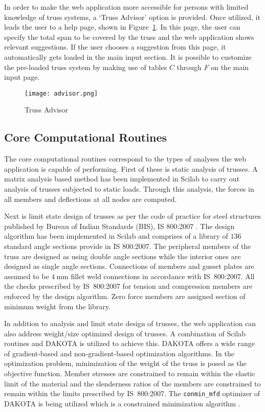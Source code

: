\documentclass[preprint]{elsarticle}
\begin{document}
In order to make the web application more accessible for persons with limited
knowledge of truss systems, a `Truss Advisor' option is provided. Once utilized,
it leads the user to a help page, shown in Figure~\ref{fig:advisor}. In this page,
the user can specify the total span to be covered by the truss and the web
application shows relevant suggestions. If the user chooses a suggestion from
this page, it automatically gets loaded in the main input section. It is
possible to customize the pre-loaded truss system by making use of tables $C$
through $F$ on the main input page.


\begin{figure}
\centering
\texttt{[image: advisor.png]}
\caption{Truss Advisor}
\label{fig:advisor}
\end{figure}


\subsection{Core Computational Routines}
The core computational routines correspond to the types of analyses the web
application is capable of performing. First of these is static analysis of
trusses. A matrix analysis based method has been implemented in Scilab to carry
out analysis of trusses subjected to static loads. Through this analysis, the
forces in all members and deflections at all nodes are computed.

Next is limit state design of trusses as per the code of practice for steel
structures published by Bureau of Indian Standards (BIS), IS 800:2007
\cite{IS800}. The design algorithm has been implemented in Scilab and comprises
of a library of $136$ standard angle sections provide in IS 800:2007. The
peripheral members of the truss are designed as using double angle sections while
the interior ones are designed as single angle sections. Connections of members
and gusset plates are assumed to be $4~\mathrm{mm}$ fillet weld connections
in accordance with IS~800:2007. All the checks prescribed by
IS~800:2007 for tension and compression members are enforced by the design
algorithm. Zero force members are assigned section of minimum weight from the
library.

In addition to analysis and limit state design of trusses, the web application
can also address weight/size optimized design of trusses. A
combination of Scilab routines and DAKOTA is utilized to achieve this. DAKOTA
offers a wide range of gradient-based and non-gradient-based optimization
algorithms. In the optimization problem, minimization of the weight of the truss
is posed as the objective function. Member stresses are constrained to remain
within the elastic limit of the material and the slenderness ratios of the members are 
constrained to remain within the limits prescribed by IS~800:2007. The 
\texttt{conmin\_mfd} optimizer of DAKOTA is being utilized which is a constrained 
minimization algorithm \cite{Vanderplaats1973}.
\end{document}
